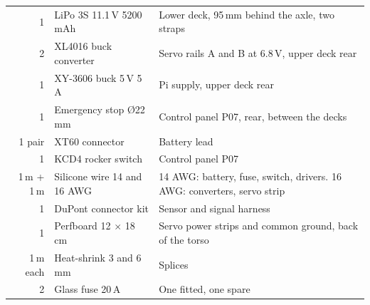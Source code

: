 \documentclass[11pt,a4paper]{article}
\begin{document}
{\begin{longtable}{@{}rP{54mm}P{92mm}@{}}
1 & LiPo 3S 11.1\,V 5200\,mAh & Lower deck, 95\,mm behind the axle, two straps\\
2 & XL4016 buck converter & Servo rails A and B at 6.8\,V, upper deck rear\\
1 & XY-3606 buck 5\,V 5\,A & Pi supply, upper deck rear\\
1 & Emergency stop \O22\,mm & Control panel P07, rear, between the decks\\
1 pair & XT60 connector & Battery lead\\
1 & KCD4 rocker switch & Control panel P07\\
1\,m + 1\,m & Silicone wire 14 and 16 AWG & 14 AWG: battery, fuse, switch, drivers. 16 AWG: converters, servo strip\\
1 & DuPont connector kit & Sensor and signal harness\\
1 & Perfboard 12 $\times$ 18\,cm & Servo power strips and common ground, back of the torso\\
1\,m each & Heat-shrink 3 and 6\,mm & Splices\\
2 & Glass fuse 20\,A & One fitted, one spare\\
\bottomrule
\end{longtable}}
\end{document}
